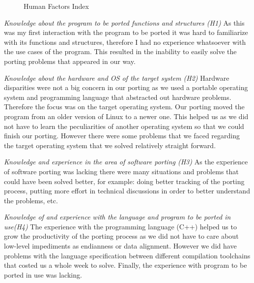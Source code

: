 \begin{figure}

    \caption{Human Factors Index}
    \label{fig:HFI}
\end{figure}

\textit{Knowledge about the program to be ported functions and structures (H1)} 
As this was my first interaction with the program to be ported it was hard to
familiarize with its functions and structures, therefore I had no experience
whatsoever with the use cases of the program. This resulted in the inability to
easily solve the porting problems that appeared in our way.

\textit{Knowledge about the hardware and OS of the target system (H2)}
Hardware disparities were not a big concern in our porting as we used a portable
operating system and programming language that abstracted out hardware problems.
Therefore the focus was on the target operating system. Our porting moved the
program from an older version of Linux to a newer one. This helped us as we
did not have to learn the peculiarities of another operating system so that we
could finish our porting. However there were some problems that we faced
regarding the target operating system that we solved relatively straight
forward.

\textit{Knowledge and experience in the area of software porting (H3)}
As the experience of software porting was lacking there were many situations
and problems that could have been solved better, for example: doing better
tracking of the porting process, putting more effort in technical discussions
in order to better understand the problems, etc.

\textit{Knowledge of and experience with the language and program to be ported
in use(H4)}
The experience with the programming language (C++) helped us to grow the
productivity of the porting process as we did not have to care about low-level
impediments as endianness or data alignment. However we did have problems with
the language specification between different compilation toolchains that costed
us a whole week to solve. Finally, the experience with program to be ported in
use was lacking.

